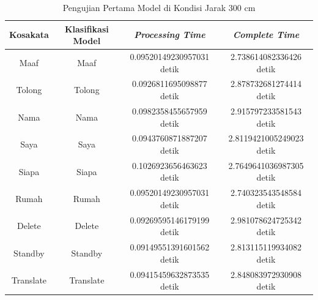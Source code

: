 \begin{longtable}{|c|c|c|c|}
  \caption{Pengujian Pertama Model di Kondisi Jarak 300 cm}
  \label{tb:prediksijauh1}                                   \\
  \hline
  \rowcolor[HTML]{C0C0C0}
  \textbf{Kosakata} & \textbf{Klasifikasi Model} & \textbf{\emph{Processing Time}} & \textbf{\emph{Complete Time}}\\
  \hline
  Maaf              & Maaf                          & 0.09520149230957031 detik                           & 2.738614082336426 detik                                  \\
  Tolong            & Tolong                        & 0.0926811695098877 detik                            & 2.878732681274414 detik                                  \\
  Nama              & Nama                          & 0.0982358455657959 detik                            & 2.915797233581543 detik                                  \\
  Saya              & Saya                          & 0.0943760871887207 detik                            & 2.8119421005249023 detik                                  \\
  Siapa              & Siapa                        & 0.1026923656463623 detik                            & 2.7649641036987305 detik                                  \\
  Rumah             & Rumah                         & 0.09520149230957031 detik                           & 2.740323543548584 detik                                  \\
  Delete            & Delete                        & 0.09269595146179199 detik                           & 2.981078624725342 detik                                  \\
  Standby           & Standby                       & 0.09149551391601562 detik                           & 2.813115119934082 detik                                  \\
  Translate         & Translate                     & 0.09415459632873535 detik                           & 2.848083972930908 detik                                  \\
  \hline
\end{longtable}


